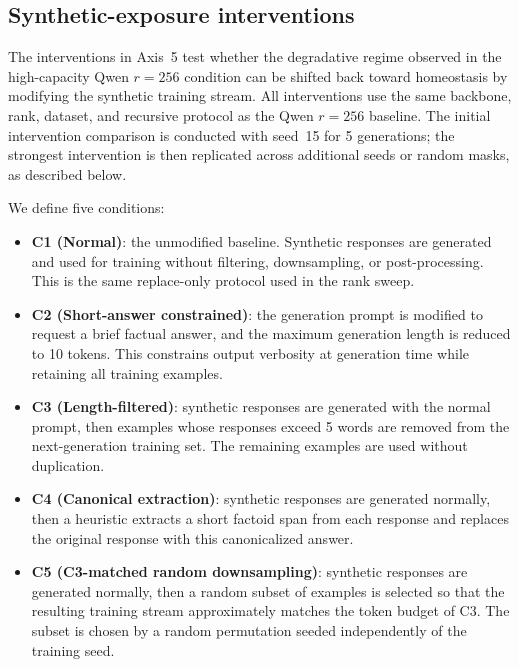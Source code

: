 \documentclass[a4paper,fleqn]{cas-dc}
\begin{document}
\subsection{Synthetic-exposure interventions}\label{sec:intervention}

The interventions in Axis~5 test whether the degradative regime observed in the
high-capacity Qwen $r=256$ condition can be shifted back toward homeostasis by
modifying the synthetic training stream. All interventions use the same backbone,
rank, dataset, and recursive protocol as the Qwen $r=256$ baseline. The initial
intervention comparison is conducted with seed~15 for 5 generations; the
strongest intervention is then replicated across additional seeds or random
masks, as described below.

We define five conditions:

\begin{itemize}
    \item \textbf{C1 (Normal)}: the unmodified baseline. Synthetic responses are
    generated and used for training without filtering, downsampling, or
    post-processing. This is the same replace-only protocol used in the rank
    sweep.

    \item \textbf{C2 (Short-answer constrained)}: the generation prompt is
    modified to request a brief factual answer, and the maximum generation length
    is reduced to 10 tokens. This constrains output verbosity at generation time
    while retaining all training examples.

    \item \textbf{C3 (Length-filtered)}: synthetic responses are generated with
    the normal prompt, then examples whose responses exceed 5 words are removed
    from the next-generation training set. The remaining examples are used
    without duplication.

    \item \textbf{C4 (Canonical extraction)}: synthetic responses are generated
    normally, then a heuristic extracts a short factoid span from each response
    and replaces the original response with this canonicalized answer.

    \item \textbf{C5 (C3-matched random downsampling)}: synthetic responses are
    generated normally, then a random subset of examples is selected so that the
    resulting training stream approximately matches the token budget of C3. The
    subset is chosen by a random permutation seeded independently of the training
    seed.
\end{itemize}
\end{document}
